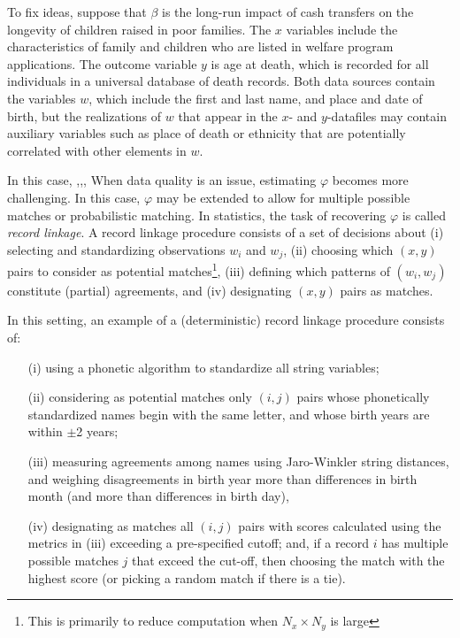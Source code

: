 \documentclass[12pt]{article}
\begin{document}
To fix ideas, suppose that $\beta$ is the long-run impact of cash transfers on the longevity of children raised in poor families.  The $x$ variables include the characteristics of family and children who are listed in welfare program applications.  The outcome variable $y$ is age at death, which is recorded for all individuals in a universal database of death records.  Both data sources contain the variables $w$, which include the first and last name, and place and date of birth, but the realizations of $w$ that appear in the $x$- and $y$-datafiles may contain auxiliary variables such as place of death or ethnicity that are potentially correlated with other elements in $w$.

In this case, ,,, When data quality is an issue, estimating $\varphi$ becomes more challenging.  In this case, $\varphi$ may be extended to allow for multiple possible matches or probabilistic matching.  In statistics, the task of recovering $\varphi$ is called \textit{record linkage}.  A record linkage procedure consists of a set of decisions about (i) selecting and standardizing observations $w_i$ and $w_j$, (ii) choosing which $(x,y)$ pairs to consider as potential matches\footnote{This is primarily to reduce computation when $N_x \times N_y$ is large}, (iii) defining which patterns of $(w_i,w_j)$ constitute (partial) agreements, and (iv) designating $(x,y)$ pairs as matches.



In this setting, an example of a (deterministic) record linkage procedure consists of: 
\begin{enumerate}
\item[(i)] using a phonetic algorithm to standardize all string variables; 
\item[(ii)] considering as potential matches only $(i,j)$ pairs whose phonetically standardized names begin with the same letter, and whose birth years are within $\pm$2 years;
\item[(iii)] measuring agreements among names using Jaro-Winkler string distances, and weighing disagreements in birth year more than differences in birth month (and more than differences in birth day), 
\item[(iv)] designating as matches all $(i,j)$ pairs with scores calculated using the metrics in (iii) exceeding a pre-specified cutoff; and, if a record $i$ has multiple possible matches $j$ that exceed the cut-off, then choosing the match with the highest score (or picking a random match if there is a tie).  
\end{enumerate}
\end{document}
